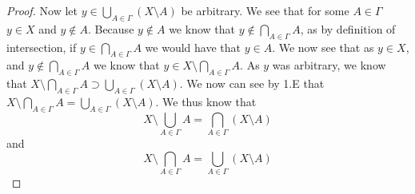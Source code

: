 \begin{proof}
Now let $y \in \bigcup_{A\in\Gamma} (X\setminus A)$ be arbitrary. We
see that for some $A \in\Gamma$ $y \in X$ and $y\notin A$. Because
$y\notin A$ we know that $y\notin \bigcap_{A\in\Gamma} A$, as by
definition of intersection, if  $y\in \bigcap_{A\in\Gamma} A$ we would
have that $y\in A$. We now see that as $y\in X$, and $y \notin
\bigcap_{A\in\Gamma} A$ we know that $y \in X \setminus \bigcap_{A \in
  \Gamma} A$. As $y$ was arbitrary, we know that  
$X \setminus \bigcap_{A \in \Gamma} A \supset \bigcup_{A\in\Gamma} 
(X\setminus A)$. We now can see by 1.E that  
$X \setminus \bigcap_{A \in \Gamma} A = \bigcup_{A\in\Gamma}
(X\setminus A)$.
We thus know that 
$$X \setminus \bigcup_{A \in \Gamma} A = \bigcap_{A\in\Gamma} (X \setminus A) $$
and
$$X \setminus \bigcap_{A \in \Gamma} A = \bigcup_{A\in\Gamma} (X \setminus A) $$
\end{proof}

